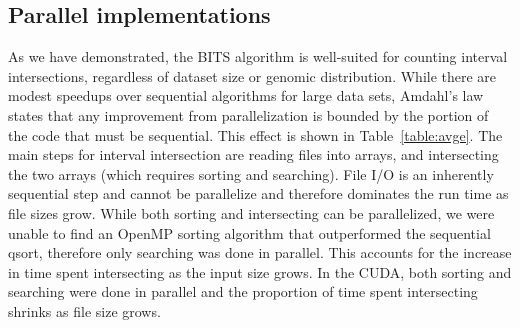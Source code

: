 \documentclass{bioinfo}
\begin{document}


        \subsection{Parallel implementations}
        
        As we have demonstrated, the BITS algorithm is well-suited for counting interval
        intersections, regardless of dataset size or genomic distribution.  While there
        are modest speedups over sequential algorithms for large data sets, Amdahl's
        law~\cite{amdahl1967} states that any improvement from parallelization is
        bounded by  the portion of the code that must be sequential.  This effect is
        shown in Table~\ref{table:avge}.  The main steps for interval intersection are
        reading files into arrays, and intersecting the two arrays (which requires
        sorting and searching).  File I/O is an inherently sequential step and cannot be
        parallelize and therefore dominates the run time as file sizes grow.  While both
        sorting and intersecting can be parallelized, we were unable to find an OpenMP
        sorting algorithm that outperformed the sequential qsort, therefore only
        searching was done in parallel.  This accounts for the increase in time spent
        intersecting as the input size grows.  In the CUDA, both sorting and searching
        were done in parallel and the proportion of time spent intersecting shrinks as
        file size grows.
        
\end{document}
